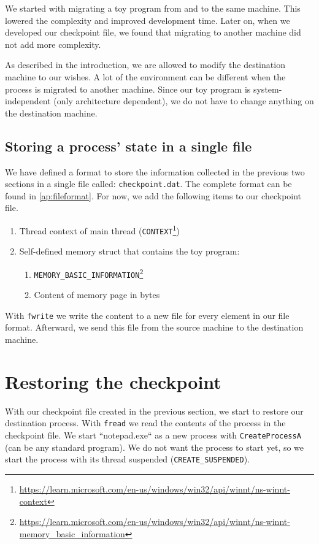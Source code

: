 \documentclass[a4paper, 11pt, english]{report}
\begin{document}
We started with migrating a toy program from and to the same machine. This lowered the complexity and improved development time. Later on, when we developed our checkpoint file, we found that migrating to another machine did not add more complexity.

As described in the introduction, we are allowed to modify the destination machine to our wishes.
A lot of the environment can be different when the process is migrated to another machine. Since our toy program is system-independent (only architecture dependent), we do not have to change anything on the destination machine.

\subsection{Storing a process' state in a single file}
\label{sec:storing-state}
We have defined a format to store the information collected in the previous two sections in a single file called: \texttt{checkpoint.dat}. The complete format can be found in \autoref{ap:fileformat}. For now, we add the following items to our checkpoint file.

\begin{enumerate}
	\item Thread context of main thread (\texttt{CONTEXT}\footnote{\url{https://learn.microsoft.com/en-us/windows/win32/api/winnt/ns-winnt-context}})
	\item Self-defined memory struct that contains the toy program:
		\begin{enumerate}
		\item \texttt{MEMORY\_BASIC\_INFORMATION}\footnote{\url{https://learn.microsoft.com/en-us/windows/win32/api/winnt/ns-winnt-memory_basic_information}}
		\item Content of memory page in bytes
		\end{enumerate}
	      
\end{enumerate}

With \texttt{fwrite} we write the content to a new file for every element in our file format.
Afterward, we send this file from the source machine to the destination machine.

\section{Restoring the checkpoint}
\label{sec:restoring-checkpoint-shellcode}

With our checkpoint file created in the previous section, we start to restore our destination process. With \texttt{fread} we read the contents of the process in the checkpoint file.
We start ``notepad.exe`` as a new process with \texttt{CreateProcessA} (can be any standard program). We do not want the process to start yet, so we start the process with its thread suspended (\texttt{CREATE\_SUSPENDED}).
\end{document}
